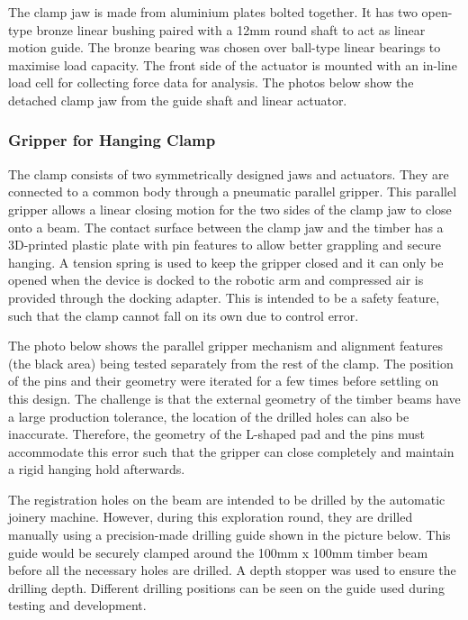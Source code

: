 The clamp jaw is made from aluminium plates bolted together. It has two open-type bronze linear bushing paired with a 12mm round shaft to act as linear motion guide. The bronze bearing was chosen over ball-type linear bearings to maximise load capacity. The front side of the actuator is mounted with an in-line load cell for collecting force data for analysis. The photos below show the detached clamp jaw from the guide shaft and linear actuator. 

\subsubsection{Gripper for Hanging Clamp}
\label{subsubsection:exploration-1-gripper-for-hanging-clamp}

The clamp consists of two symmetrically designed jaws and actuators. They are connected to a common body through a pneumatic parallel gripper. This parallel gripper allows a linear closing motion for the two sides of the clamp jaw to close onto a beam.
The contact surface between the clamp jaw and the timber has a 3D-printed plastic plate with pin features to allow better grappling and secure hanging. A tension spring is used to keep the gripper closed and it can only be opened when the device is docked to the robotic arm and compressed air is provided through the docking adapter. This is intended to be a safety feature, such that the clamp cannot fall on its own due to control error.

The photo below shows the parallel gripper mechanism and alignment features (the black area) being tested separately from the rest of the clamp. The position of the pins and their geometry were iterated for a few times before settling on this design. The challenge is that the external geometry of the timber beams have a large production tolerance, the location of the drilled holes can also be inaccurate. Therefore, the geometry of the L-shaped pad and the pins must accommodate this error such that the gripper can close completely and maintain a rigid hanging hold afterwards.

The registration holes on the beam are intended to be drilled by the automatic joinery machine. However, during this exploration round, they are drilled manually using a precision-made drilling guide shown in the picture below. This guide would be securely  clamped around the 100mm x 100mm timber beam before all the necessary holes are drilled. A depth stopper was used to ensure the drilling depth. Different drilling positions can be seen on the guide used during testing and development.


